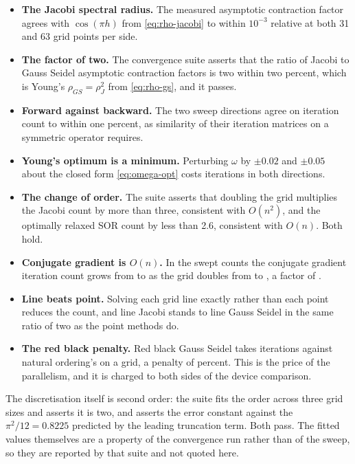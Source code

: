 \begin{itemize}
  \item \textbf{The Jacobi spectral radius.} The measured asymptotic contraction
        factor agrees with $\cos(\pi h)$ from \eqref{eq:rho-jacobi} to within
        $10^{-3}$ relative at both 31 and 63 grid points per side.
  \item \textbf{The factor of two.} The convergence suite asserts that the ratio
        of Jacobi to Gauss Seidel asymptotic contraction factors is two within
        two percent, which is Young's $\rho_{GS} = \rho_J^2$ from
        \eqref{eq:rho-gs}, and it passes.
  \item \textbf{Forward against backward.} The two sweep directions agree on
        iteration count to within one percent, as similarity of their iteration
        matrices on a symmetric operator requires.
  \item \textbf{Young's optimum is a minimum.} Perturbing $\omega$ by $\pm 0.02$
        and $\pm 0.05$ about the closed form \eqref{eq:omega-opt} costs
        iterations in both directions.
  \item \textbf{The change of order.} The suite asserts that doubling the grid
        multiplies the Jacobi count by more than three, consistent with
        $O(n^2)$, and the optimally relaxed SOR count by less than 2.6,
        consistent with $O(n)$. Both hold.
  \item \textbf{Conjugate gradient is $O(n)$.} In the swept counts the
        conjugate gradient iteration count grows from \pnlCgIterationsSmall{} to
        \pnlCgIterationsLarge{} as the grid doubles from \pnlCgGridSmall{} to
        \pnlCgGridLarge{}, a factor of \pnlCgGrowthFactor{}.
  \item \textbf{Line beats point.} Solving each grid line exactly rather than
        each point reduces the count, and line Jacobi stands to line Gauss
        Seidel in the same ratio of two as the point methods do.
  \item \textbf{The red black penalty.} Red black Gauss Seidel takes
        \pnlRedBlackIterations{} iterations against natural ordering's
        \pnlNaturalIterations{} on a \pnlRedBlackGrid{} grid, a penalty of
        \pnlRedBlackPenalty{} percent. This is the price of the parallelism, and
        it is charged to both sides of the device comparison.
\end{itemize}

The discretisation itself is second order: the suite fits the order across three
grid sizes and asserts it is two, and asserts the error constant against the
$\pi^2/12 = 0.8225$ predicted by the leading truncation term. Both pass. The
fitted values themselves are a property of the convergence run rather than of
the sweep, so they are reported by that suite and not quoted here.

